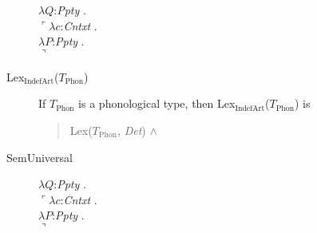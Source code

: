 \begin{description}

$\lambda Q$:\textit{Ppty} . \\
  \hspace*{1em}$\ulcorner\lambda c$:\textit{Cntxt} . \\
  \hspace*{2em}$\lambda P$:\textit{Ppty} . \\
  \hspace*{3em}$\urcorner$



 

        
      \item[\textnormal{Lex$_{\mathrm{IndefArt}}$($T_{\mathrm{Phon}}$)}]
        \mbox{}

        If $T_{\mathrm{Phon}}$ is a phonological type, then
        Lex$_{\mathrm{IndefArt}}$($T_{\mathrm{Phon}}$) is
        \begin{quote}
          Lex($T_{\mathrm{Phon}}$, \textit{Det}) \d{$\wedge$}
        \end{quote}

        
      \item[\textnormal{SemUniversal}] \mbox{}

               $\lambda Q$:\textit{Ppty} . \\
  \hspace*{1em}$\ulcorner\lambda c$:\textit{Cntxt} . \\
  \hspace*{2em}$\lambda P$:\textit{Ppty} . \\
  \hspace*{3em}$\urcorner$


\end{description}
